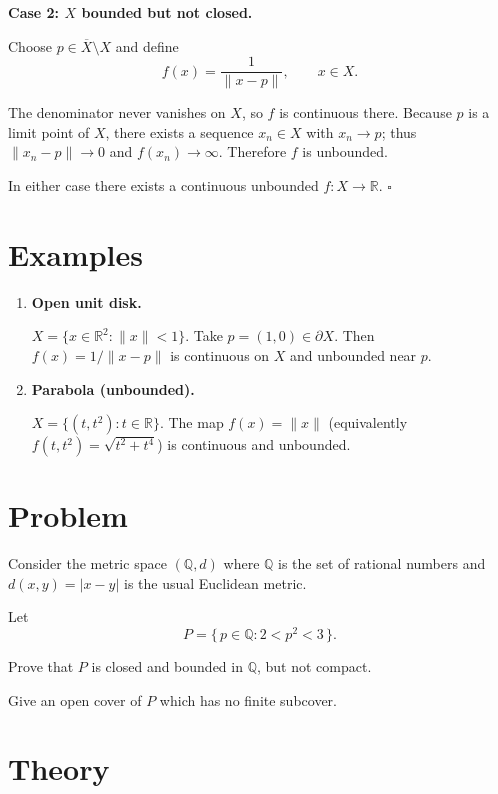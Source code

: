 \documentclass[12pt,a4paper]{article}
\newcommand{\qed}{\hfill$\square$}
\theoremstyle{plain}
\theoremstyle{definition}
\theoremstyle{remark}
\theoremstyle{remark}
\begin{document}
\bigskip

\noindent\textbf{Case 2: \(X\) bounded but not closed.}

Choose \(p\in\overline{X}\setminus X\) and define
\[
f(x)=\frac{1}{\|x-p\|}, \qquad x\in X .
\]

The denominator never vanishes on \(X\), so \(f\) is continuous there.
Because \(p\) is a limit point of \(X\), there exists a sequence \(x_n\in X\) with \(x_n\to p\);
thus \(\|x_n-p\|\to 0\) and \(f(x_n)\to\infty\).
Therefore \(f\) is unbounded.

\bigskip

In either case there exists a continuous unbounded \(f:X\to\mathbb{R}\). \qed

\bigskip

\section*{Examples}

\begin{enumerate}

\item \textbf{Open unit disk.}

\(X=\{x\in\mathbb{R}^2:\|x\|<1\}\).
Take \(p=(1,0)\in\partial X\).
Then \(f(x)=1/\|x-p\|\) is continuous on \(X\) and unbounded near \(p\).

\item \textbf{Parabola (unbounded).}

\(X=\{(t,t^2):t\in\mathbb{R}\}\).
The map \(f(x)=\|x\|\) (equivalently \(f(t,t^2)=\sqrt{t^2+t^4}\))
is continuous and unbounded.

\end{enumerate}

\section*{Problem}

Consider the metric space \((\mathbb{Q},d)\) where \(\mathbb{Q}\) is the set of rational numbers and \(d(x,y)=|x-y|\) is the usual Euclidean metric.

Let
\[
P = \{\, p\in\mathbb{Q} : 2 < p^2 < 3 \,\}.
\]

Prove that \(P\) is closed and bounded in \(\mathbb{Q}\), but not compact.

Give an open cover of \(P\) which has no finite subcover.

\bigskip

\section*{Theory}
\end{document}
